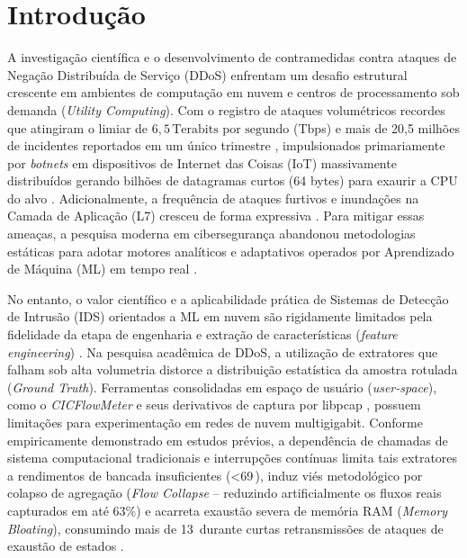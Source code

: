 \documentclass[conference]{IEEEtran}
\begin{document}
\section{Introdução}
A investigação científica e o desenvolvimento de contramedidas contra ataques de Negação Distribuída de Serviço (DDoS) enfrentam um desafio estrutural crescente em ambientes de computação em nuvem e centros de processamento sob demanda (\textit{Utility Computing}). Com o registro de ataques volumétricos recordes que atingiram o limiar de $6,5\,\text{Terabits por segundo}$ (Tbps) e mais de 20,5 milhões de incidentes reportados em um único trimestre \cite{cloudflare_2025}, impulsionados primariamente por \textit{botnets} em dispositivos de Internet das Coisas (IoT) massivamente distribuídos gerando bilhões de datagramas curtos (64 bytes) para exaurir a CPU do alvo \cite{gelgi_systematic_2024, yue_dad_2025, korba_ai-driven_2024, saied_review_2025}. Adicionalmente, a frequência de ataques furtivos e inundações na Camada de Aplicação (L7) cresceu de forma expressiva \cite{imperva_2024}. Para mitigar essas ameaças, a pesquisa moderna em cibersegurança abandonou metodologias estáticas para adotar motores analíticos e adaptativos operados por Aprendizado de Máquina (ML) em tempo real \cite{apostu_detecting_2025, alomari_comprehensive_2024, bahashwan_systematic_2023, suvra_efficient_2025}.

No entanto, o valor científico e a aplicabilidade prática de Sistemas de Detecção de Intrusão (IDS) orientados a ML em nuvem são rigidamente limitados pela fidelidade da etapa de engenharia e extração de características (\textit{feature engineering}) \cite{yue_dad_2025}. Na pesquisa acadêmica de DDoS, a utilização de extratores que falham sob alta volumetria distorce a distribuição estatística da amostra rotulada (\textit{Ground Truth}). Ferramentas consolidadas em espaço de usuário (\textit{user-space}), como o \textit{CICFlowMeter} e seus derivativos de captura por libpcap \cite{shafi_ntlflowlyzer_2025}, possuem limitações para experimentação em redes de nuvem multigigabit. Conforme empiricamente demonstrado em estudos prévios, a dependência de chamadas de sistema computacional tradicionais e interrupções contínuas limita tais extratores a rendimentos de bancada insuficientes (<69\,), induz viés metodológico por colapso de agregação (\textit{Flow Collapse} -- reduzindo artificialmente os fluxos reais capturados em até 63\%) e acarreta exaustão severa de memória RAM (\textit{Memory Bloating}), consumindo mais de 13\, durante curtas retransmissões de ataques de exaustão de estados \cite{shafi_ntlflowlyzer_2025}.
\end{document}
